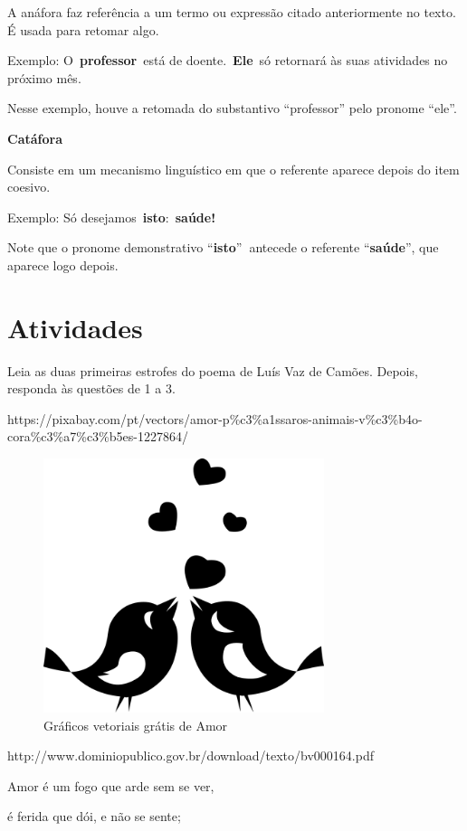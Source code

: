 {A anáfora faz referência a um termo ou expressão citado anteriormente no
texto. É usada para retomar algo.

Exemplo: O~\textbf{professor}~está de doente.~\textbf{Ele}~só retornará
às suas atividades no próximo mês.

Nesse exemplo, houve a retomada do substantivo ``professor'' pelo
pronome ``ele''.

\textbf{Catáfora}

Consiste em um mecanismo linguístico em que o referente aparece depois
do item coesivo.

Exemplo: Só desejamos~\textbf{isto}:~\textbf{saúde!}

Note que o pronome demonstrativo ``\textbf{isto}''\textbf{~}antecede o
referente ``\textbf{saúde}'', que aparece logo depois.
}

\section{Atividades}

Leia as duas primeiras estrofes do poema de Luís Vaz de Camões. Depois,
responda às questões de 1 a 3.

https://pixabay.com/pt/vectors/amor-p\%c3\%a1ssaros-animais-v\%c3\%b4o-cora\%c3\%a7\%c3\%b5es-1227864/

\begin{figure}
\centering
\includegraphics[width=3.22917in,height=2.92805in]{./_SAEB_9_POR/media/image24.png}
\caption{Gráficos vetoriais grátis de Amor}
\end{figure}

http://www.dominiopublico.gov.br/download/texto/bv000164.pdf

Amor é um fogo que arde sem se ver,

é ferida que dói, e não se sente;

